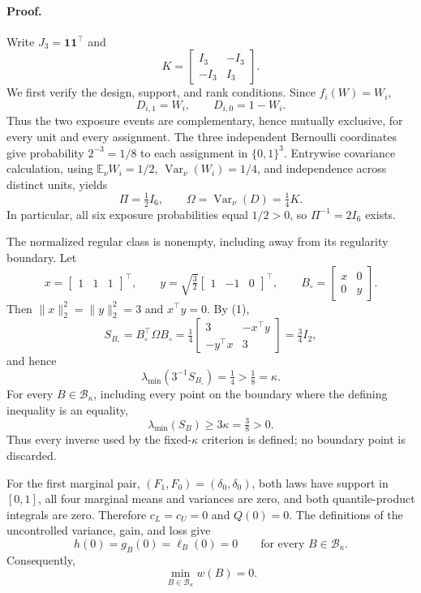 \paragraph{Proof.}
Write \(J_3=\mathbf 1\mathbf 1^{\top}\) and
\[
K=\begin{bmatrix}I_3&-I_3\\-I_3&I_3\end{bmatrix}.
\]
We first verify the design, support, and rank conditions. Since \(f_i(W)=W_i\),
\[
D_{i,1}=W_i,
\qquad
D_{i,0}=1-W_i.
\]
Thus the two exposure events are complementary, hence mutually exclusive, for every unit and every assignment. The three independent Bernoulli coordinates give probability \(2^{-3}=1/8\) to each assignment in \(\{0,1\}^3\). Entrywise covariance calculation, using \(\mathbb E_\nu W_i=1/2\), \(\operatorname{Var}_\nu(W_i)=1/4\), and independence across distinct units, yields
\[
\Pi=\tfrac12 I_6,
\qquad
\Omega=\operatorname{Var}_\nu(D)=\tfrac14K.
\tag{1}
\]
In particular, all six exposure probabilities equal \(1/2>0\), so \(\Pi^{-1}=2I_6\) exists.

The normalized regular class is nonempty, including away from its regularity boundary. Let
\[
x=\begin{bmatrix}1&1&1\end{bmatrix}^{\top},
\qquad
y=\sqrt{\tfrac32}\begin{bmatrix}1&-1&0\end{bmatrix}^{\top},
\qquad
B_\circ=\begin{bmatrix}x&0\\0&y\end{bmatrix}.
\]
Then \(\lVert x\rVert_2^2=\lVert y\rVert_2^2=3\) and \(x^{\top}y=0\). By (1),
\[
S_{B_\circ}=B_\circ^{\top}\Omega B_\circ
=\tfrac14\begin{bmatrix}3&-x^{\top}y\\-y^{\top}x&3\end{bmatrix}
=\tfrac34 I_2,
\]
and hence
\[
\lambda_{\min}(3^{-1}S_{B_\circ})=\tfrac14>\tfrac18=\kappa.
\tag{2}
\]
For every \(B\in\mathcal B_\kappa\), including every point on the boundary where the defining inequality is an equality,
\[
\lambda_{\min}(S_B)\ge 3\kappa=\tfrac38>0.
\tag{3}
\]
Thus every inverse used by the fixed-\(\kappa\) criterion is defined; no boundary point is discarded.

For the first marginal pair, \((F_1,F_0)=(\delta_0,\delta_0)\), both laws have support in \([0,1]\), all four marginal means and variances are zero, and both quantile-product integrals are zero. Therefore \(c_L=c_U=0\) and \(Q(0)=0\). The definitions of the uncontrolled variance, gain, and loss give
\[
h(0)=g_B(0)=\ell_B(0)=0
\qquad\text{for every }B\in\mathcal B_\kappa.
\]
Consequently,
\[
\min_{B\in\mathcal B_\kappa}w(B)=0.
\tag{4}
\]

